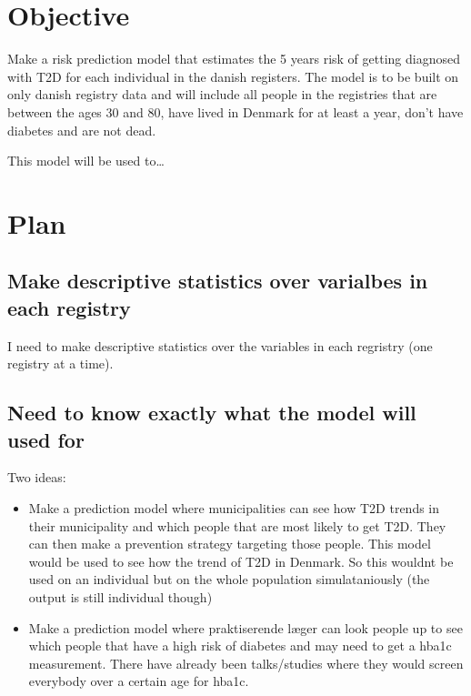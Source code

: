 \documentclass[11pt]{article}
\author{Hjalte Søberg Mikkelsen}
\date{\today}
\title{}
\begin{document}
\tableofcontents

\section{Objective}
\label{sec:org80830c4}
Make a risk prediction model that estimates the 5 years risk of getting diagnosed with T2D for each individual in the danish registers. The model is to be built on only danish registry data and will include all people in the registries that are between the ages 30 and 80, have lived in Denmark for at least a year, don't have diabetes and are not dead.

This model will be used to\ldots{}

\section{Plan}
\label{sec:org8333e16}

\subsection{Make descriptive statistics over varialbes in each registry}
\label{sec:org5eeb7c6}

I need to make descriptive statistics over the variables in each regristry (one registry at a time).

\subsection{Need to know exactly what the model will used for}
\label{sec:org42518b7}
Two ideas:
\begin{itemize}
\item Make a prediction model where municipalities can see how T2D trends in their municipality and which people that are most likely to get T2D. They can then make a prevention strategy targeting those people. This model would be used to see how the trend of T2D in Denmark. So this wouldnt be used on an individual but on the whole population simulataniously (the output is still individual though)

\item Make a prediction model where praktiserende læger can look people up to see which people that have a high risk of diabetes and may need to get a hba1c measurement. There have already been talks/studies where they would screen everybody over a certain age for hba1c.
\end{itemize}
\end{document}
